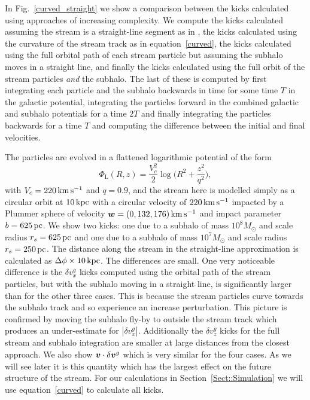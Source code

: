 \documentclass[useAMS,usenatbib,fleqn,a4paper]{mn2e}
\def\kpc{\,{\rm kpc}}
\def\pc{\,{\rm pc}}
\def\kms{\,{\rm km\,s^{-1}}}
\newcommand{\bs}[1]{\bmath{#1}}
\begin{document}
In Fig.~\ref{curved_straight} we show a comparison between the kicks calculated using approaches of increasing complexity. We compute the kicks calculated assuming the stream is a straight-line segment as in \cite{ErkalBelokurov2015}, the kicks calculated using the curvature of the stream track as in equation~\eqref{curved}, the kicks calculated using the full orbital path of each stream particle but assuming the subhalo moves in a straight line, and finally the kicks calculated using the full orbit of the stream particles \emph{and} the subhalo. The last of these is computed by first integrating each particle and the subhalo backwards in time for some time $T$ in the galactic potential, integrating the particles forward in the combined galactic and subhalo potentials for a time $2T$ and finally integrating the particles backwards for a time $T$ and computing the difference between the initial and final velocities.

The particles are evolved in a flattened logarithmic potential of the form
\begin{equation}
\Phi_\mathrm{L}(R,z) = \frac{V_c^2}{2}\log\Big(R^2+\frac{z^2}{q^2}\Big),
\label{potential}
\end{equation}
with $V_c = 220\kms$ and $q = 0.9$, and the stream here is modelled simply as a circular orbit at $10\kpc$ with a circular velocity of $220\kms$ impacted by a Plummer sphere of velocity $\bs{w}=(0,132,176)\kms$ and impact parameter $b=625\pc$. We show two kicks: one due to a subhalo of mass $10^8M_\odot$ and scale radius $r_s=625\pc$ and one due to a subhalo of mass $10^7M_\odot$ and scale radius $r_s=250\pc$. The distance along the stream in the straight-line approximation is calculated as $\Delta\phi\times10\kpc$. The differences are small. One very noticeable difference is the $\delta v^g_x$ kicks computed using the orbital path of the stream particles, but with the subhalo moving in a straight line, is significantly larger than for the other three cases. This is because the stream particles curve towards the subhalo track and so experience an increase perturbation. This picture is confirmed by moving the subhalo fly-by to outside the stream track which produces an under-estimate for $|\delta v^g_x|$. Additionally the $\delta v^g_z$ kicks for the full stream and subhalo integration are smaller at large distances from the closest approach. We also show $\bs{v}\cdot\delta\bs{v}^g$ which is very similar for the four cases. As we will see later it is this quantity which has the largest effect on the future structure of the stream. For our calculations in Section~\ref{Sect::Simulation} we will use equation~\eqref{curved} to calculate all kicks.
\end{document}
